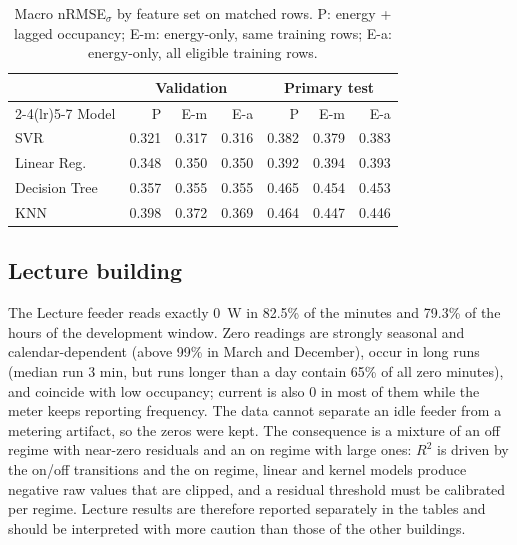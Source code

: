 \documentclass[conference]{IEEEtran}
\begin{document}
\begin{table}[t]
\caption{Macro nRMSE$_\sigma$ by feature set on matched rows. P: energy + lagged occupancy; E-m: energy-only, same training rows; E-a: energy-only, all eligible training rows.}\label{tab:fs}
\centering\small
\begin{tabular}{lrrrrrr}
\toprule
 & \multicolumn{3}{c}{Validation} & \multicolumn{3}{c}{Primary test}\\
\cmidrule(lr){2-4}\cmidrule(lr){5-7}
Model & P & E-m & E-a & P & E-m & E-a\\
\midrule
SVR & 0.321 & 0.317 & 0.316 & 0.382 & 0.379 & 0.383 \\
Linear Reg. & 0.348 & 0.350 & 0.350 & 0.392 & 0.394 & 0.393 \\
Decision Tree & 0.357 & 0.355 & 0.355 & 0.465 & 0.454 & 0.453 \\
KNN & 0.398 & 0.372 & 0.369 & 0.464 & 0.447 & 0.446 \\

\bottomrule
\end{tabular}
\end{table}

\subsection{Lecture building}
The Lecture feeder reads exactly 0~W in 82.5\% of the minutes and 79.3\% of the hours of the development window. Zero readings are strongly seasonal and calendar-dependent (above 99\% in March and December), occur in long runs (median run 3 min, but runs longer than a day contain 65\% of all zero minutes), and coincide with low occupancy; current is also 0 in most of them while the meter keeps reporting frequency.
The data cannot separate an idle feeder from a metering artifact, so the zeros were kept. The consequence is a mixture of an off regime with near-zero residuals and an on regime with large ones: $R^2$ is driven by the on/off transitions and the on regime, linear and kernel models produce negative raw values that are clipped, and a residual threshold must be calibrated per regime. Lecture results are therefore reported separately in the tables and should be interpreted with more caution than those of the other buildings.
\end{document}
